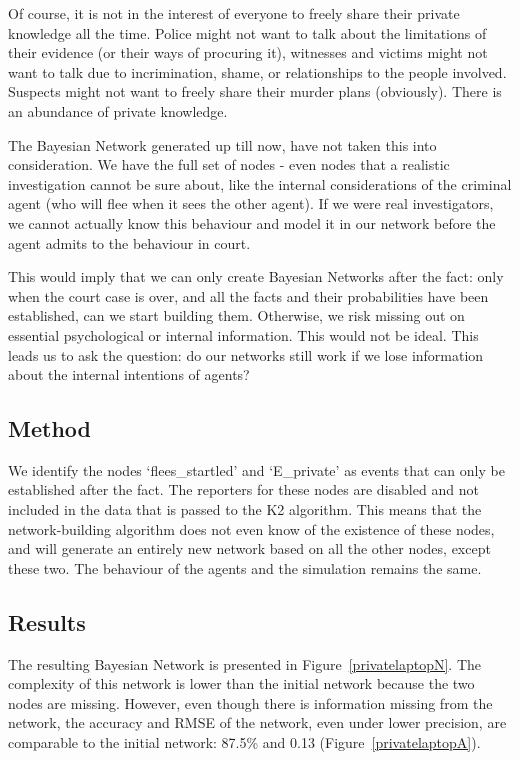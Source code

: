 Of course, it is not in the interest of everyone to freely share their private knowledge all the time. Police might not want to talk about the limitations of their evidence (or their ways of procuring it), witnesses and victims might not want to talk due to incrimination, shame, or relationships to the people involved. Suspects might not want to freely share their murder plans (obviously). There is an abundance of private knowledge.

 The Bayesian Network generated up till now, have not taken this into consideration. We have the full set of nodes - even nodes that a realistic investigation cannot be sure about, like the internal considerations of the criminal agent (who will flee when it sees the other agent). If we were real investigators, we cannot actually know this behaviour and model it in our network before the agent admits to the behaviour in court.
 
 This would imply that we can only create Bayesian Networks after the fact: only when the court case is over, and all the facts and their probabilities have been established, can we start building them. Otherwise, we risk missing out on essential psychological or internal information. This would not be ideal. This leads us to ask the question: do our networks still work if we lose information about the internal intentions of agents?

\subsection{Method}
We identify the nodes `flees\_startled' and `E\_private' as events that can only be established after the fact. The reporters for these nodes are disabled and not included in the data that is passed to the K2 algorithm. This means that the network-building algorithm does not even know of the existence of these nodes, and will generate an entirely new network based on all the other nodes, except these two. The behaviour of the agents and the simulation remains the same.

\subsection{Results}
The resulting Bayesian Network is presented in Figure~\ref{privatelaptopN}. The complexity of this network is lower than the initial network because the two nodes are missing. However, even though there is information missing from the network, the accuracy and RMSE of the network, even under lower precision, are comparable to the initial network: 87.5\% and 0.13 (Figure~\ref{privatelaptopA}).

